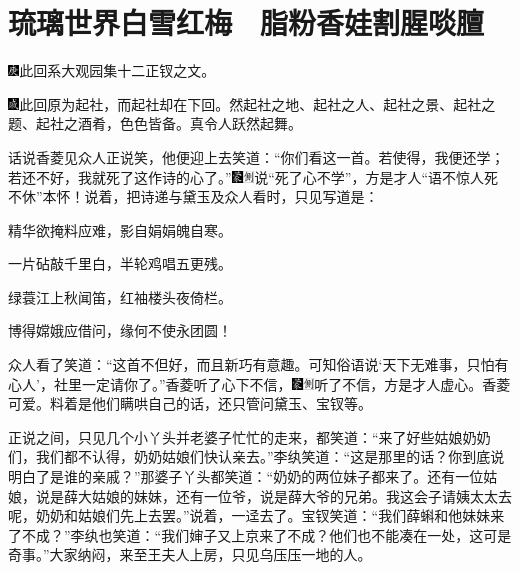 

\chapter{琉璃世界白雪红梅　脂粉香娃割腥啖膻}

{\includegraphics[width=3mm]{../Images/00004}此回系大观园集十二正钗之文。}

{\includegraphics[width=3mm]{../Images/00005}此回原为起社，而起社却在下回。然起社之地、起社之人、起社之景、起社之题、起社之酒肴，色色皆备。真令人跃然起舞。}

话说香菱见众人正说笑，他便迎上去笑道：``你们看这一首。若使得，我便还学；若还不好，我就死了这作诗的心了。''{\includegraphics[width=3mm]{../Images/00006}\includegraphics[width=3mm]{../Images/00011}\footnotesize \kaishu 说``死了心不学''，方是才人``语不惊人死不休''本怀！}说着，把诗递与黛玉及众人看时，只见写道是：

精华欲掩料应难，影自娟娟魄自寒。

一片砧敲千里白，半轮鸡唱五更残。

绿蓑江上秋闻笛，红袖楼头夜倚栏。

博得嫦娥应借问，缘何不使永团圆！

众人看了笑道：``这首不但好，而且新巧有意趣。可知俗语说`天下无难事，只怕有心人'，社里一定请你了。''香菱听了心下不信，{\includegraphics[width=3mm]{../Images/00006}\includegraphics[width=3mm]{../Images/00011}\footnotesize \kaishu 听了不信，方是才人虚心。香菱可爱。}料着是他们瞒哄自己的话，还只管问黛玉、宝钗等。

正说之间，只见几个小丫头并老婆子忙忙的走来，都笑道：``来了好些姑娘奶奶们，我们都不认得，奶奶姑娘们快认亲去。''李纨笑道：``这是那里的话？你到底说明白了是谁的亲戚？''那婆子丫头都笑道：``奶奶的两位妹子都来了。还有一位姑娘，说是薛大姑娘的妹妹，还有一位爷，说是薛大爷的兄弟。我这会子请姨太太去呢，奶奶和姑娘们先上去罢。''说着，一迳去了。宝钗笑道：``我们薛蝌和他妹妹来了不成？''李纨也笑道：``我们婶子又上京来了不成？他们也不能凑在一处，这可是奇事。''大家纳闷，来至王夫人上房，只见乌压压一地的人。

